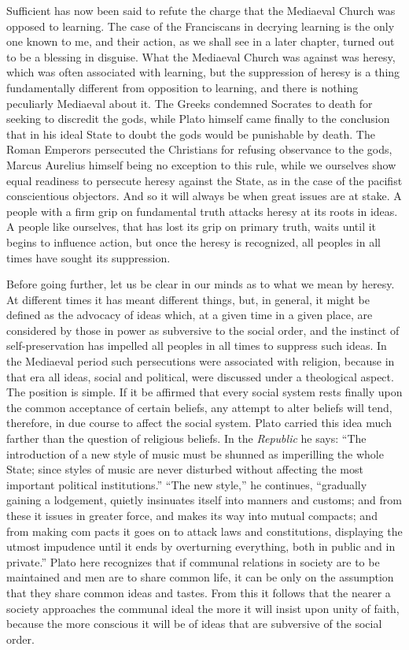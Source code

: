 \documentclass{book}
\begin{document}
Sufficient has now been said to refute the charge that the Mediaeval Church was opposed to learning. The case of the Franciscans in decrying learning is the only one known to me, and their action, as we shall see in a later chapter, turned out to be a blessing in disguise. What the Mediaeval Church was against was heresy, which was often associated with learning, but the suppression of heresy is a thing fundamentally different from opposition to learning, and there is nothing peculiarly Mediaeval about it. The Greeks condemned Socrates to death for seeking to discredit the gods, while Plato himself came finally to the conclusion that in his ideal State to doubt the gods would be punishable by death. The Roman Emperors persecuted the Christians for refusing observance to the gods, Marcus Aurelius himself being no exception to this rule, while we ourselves show equal readiness to persecute heresy against the State, as in the case of the pacifist conscientious objectors. And so it will always be when great issues are at stake. A people with a firm grip on fundamental truth attacks heresy at its roots in ideas. A people like ourselves, that has lost its grip on primary truth, waits until it begins to influence action, but once the heresy is recognized, all peoples in all times have sought its suppression.

Before going further, let us be clear in our minds as to what we mean by heresy. At different times it has meant different things, but, in general, it might be defined as the advocacy of ideas which, at a given time in a given place, are considered by those in power as subversive to the social order, and the instinct of self-preservation has impelled all peoples in all times to suppress such ideas. In the Mediaeval period such persecutions were associated with religion, because in that era all ideas, social and political, were discussed under a theological aspect. The position is simple. If it be affirmed that every social system rests finally upon the common acceptance of certain beliefs, any attempt to alter beliefs will tend, therefore, in due course to affect the social system. Plato carried this idea much farther than the question of religious beliefs. In the \emph{Republic} he says: “The introduction of a new style of music must be shunned as imperilling the whole State; since styles of music are never disturbed without affecting the most important political institutions.” “The new style,” he continues, “gradually gaining a lodgement, quietly insinuates itself into manners and customs; and from these it issues in greater force, and makes its way into mutual compacts; and from making com pacts it goes on to attack laws and constitutions, displaying the utmost impudence until it ends by overturning everything, both in public and in private.” Plato here recognizes that if communal relations in society are to be maintained and men are to share common life, it can be only on the assumption that they share common ideas and tastes. From this it follows that the nearer a society approaches the communal ideal the more it will insist upon unity of faith, because the more conscious it will be of ideas that are subversive of the social order.
\end{document}
